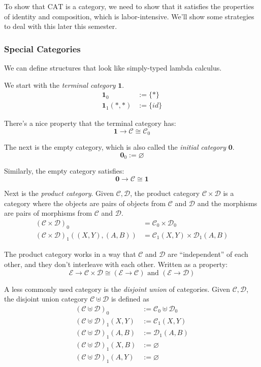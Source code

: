 \documentclass[12pt]{article}
\theoremstyle{plain}
\theoremstyle{definition}
\theoremstyle{remark}
\newcommand{\cat}[1]{\mathcal{#1}}
\begin{document}
To show that $\mathrm{CAT}$ is a category, we need to show that it satisfies the properties of identity and composition, which is labor-intensive. We'll show some strategies to deal with this later this semester.

\subsubsection*{Special Categories}

We can define structures that look like simply-typed lambda calculus.

We start with the \emph{terminal category} $\mathbf{1}$.
\begin{align*}
  \mathbf{1}_0 &:= \{ * \} \\
  \mathbf{1}_1(*, *) &:= \{ id \}
\end{align*}

There's a nice property that the terminal category has:
\[ \mathbf{1} \to \cat{C} \cong \cat{C}_0 \]

The next is the empty category, which is also called the \emph{initial category} $\mathbf{0}$.
\[ \mathbf{0}_0 := \varnothing \]

Similarly, the empty category satisfies:
\[ \mathbf{0} \to \cat{C} \cong \mathbf{1} \]

Next is the \emph{product category}. Given $\cat{C}, \cat{D}$, the product category $\cat{C} \times \cat{D}$ is a category where the objects are pairs of objects from $\cat{C}$ and $\cat{D}$ and the morphisms are pairs of morphisms from $\cat{C}$ and $\cat{D}$.
\begin{align*}
  (\cat{C} \times \cat{D})_0 &= \cat{C}_0 \times \cat{D}_0 \\
  (\cat{C} \times \cat{D})_1((X, Y), (A, B)) &= \cat{C}_1(X, Y) \times \cat{D}_1(A, B)
\end{align*}

The product category works in a way that $\cat{C}$ and $\cat{D}$ are ``independent'' of each other, and they don't interleave with each other. Written as a property:
\[ \cat{E} \to \cat{C} \times \cat{D} \cong (\cat{E} \to \cat{C}) \text{ and } (\cat{E} \to \cat{D}) \]

A less commonly used category is the \emph{disjoint union} of categories. Given $\cat{C}, \cat{D}$, the disjoint union category $\cat{C} \uplus \cat{D}$ is defined as
\begin{align*}
  (\cat{C} \uplus \cat{D})_0 &:= \cat{C}_0 \uplus \cat{D}_0 \\
  (\cat{C} \uplus \cat{D})_1(X, Y) &:= \cat{C}_1(X, Y) \\
  (\cat{C} \uplus \cat{D})_1(A, B) &:= \cat{D}_1(A, B) \\
  (\cat{C} \uplus \cat{D})_1(X, B) &:= \varnothing \\
  (\cat{C} \uplus \cat{D})_1(A, Y) &:= \varnothing
\end{align*}
\end{document}
